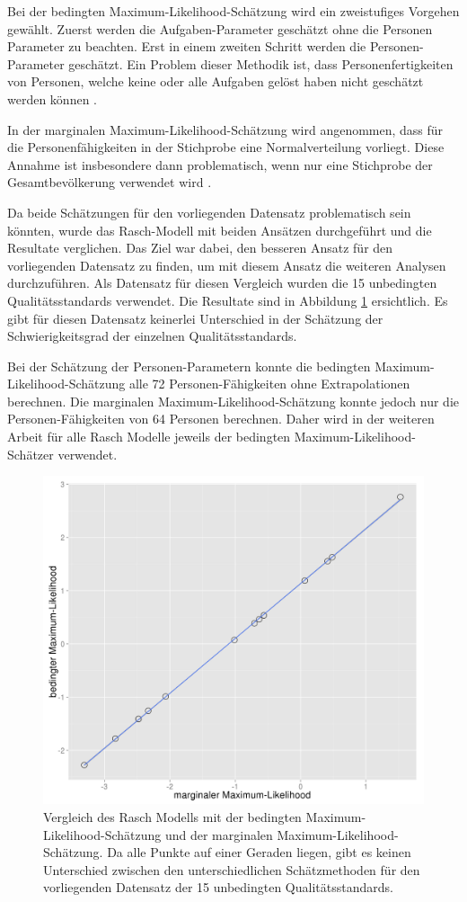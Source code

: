 Bei der bedingten Maximum-Likelihood-Schätzung wird ein zweistufiges Vorgehen gewählt. Zuerst werden die Aufgaben-Parameter geschätzt ohne die Personen Parameter zu beachten. Erst in einem zweiten Schritt werden die Personen-Parameter geschätzt. Ein Problem dieser Methodik ist, dass Personenfertigkeiten von Personen, welche keine oder alle Aufgaben gelöst haben nicht geschätzt werden können \citep{Mair2007}.

In der marginalen Maximum-Likelihood-Schätzung wird angenommen, dass für die Personenfähigkeiten in der Stichprobe eine Normalverteilung vorliegt. Diese Annahme ist insbesondere dann problematisch, wenn nur eine Stichprobe der Gesamtbevölkerung verwendet wird \citep{Rizopoulos2006}.

Da beide Schätzungen für den vorliegenden Datensatz problematisch sein könnten, wurde das Rasch-Modell mit beiden Ansätzen durchgeführt und die Resultate verglichen. Das Ziel war dabei, den besseren Ansatz für den vorliegenden Datensatz zu finden, um mit diesem Ansatz die weiteren Analysen durchzuführen. Als Datensatz für diesen Vergleich wurden die 15 unbedingten Qualitätsstandards verwendet. Die Resultate sind in Abbildung \ref{fig:RaschVergleich} ersichtlich. Es gibt für diesen Datensatz keinerlei Unterschied in der Schätzung der Schwierigkeitsgrad der einzelnen Qualitätsstandards. 

Bei der Schätzung der Personen-Parametern konnte die bedingten Maximum-Likelihood-Schätzung alle 72 Personen-Fähigkeiten ohne Extrapolationen berechnen. Die marginalen Maximum-Likelihood-Schätzung konnte jedoch nur die Personen-Fähigkeiten von 64 Personen berechnen. Daher wird in der weiteren Arbeit für alle Rasch Modelle jeweils der bedingten Maximum-Likelihood-Schätzer verwendet.


\begin{figure}[htbp]

\centering
\includegraphics[width=0.6\linewidth]{graphics/RaschVergleich.png}
\caption{Vergleich des Rasch Modells mit der bedingten Maximum-Likelihood-Schätzung und der marginalen Maximum-Likelihood-Schätzung. Da alle Punkte auf einer Geraden liegen, gibt es keinen Unterschied zwischen den unterschiedlichen Schätzmethoden für den vorliegenden Datensatz der 15 unbedingten Qualitätsstandards.  }
\label{fig:RaschVergleich}
\end{figure}


